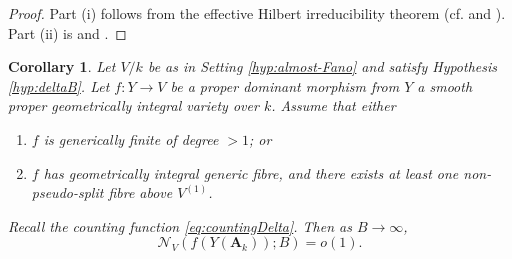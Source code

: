 \documentclass[11pt,letterpaper]{amsart}
\newcommand{\CN}{{\mathcal {N}}}
\newcommand{\RA}{{\mathbf {A}}}
\theoremstyle{plain}
\numberwithin{equation}{section}
\newtheorem{corollary}[theorem]{Corollary}
\theoremstyle{definition}
\theoremstyle{remark}
\begin{document}
\begin{proof}
	Part (i) follows from the effective Hilbert irreducibility theorem (cf. \cite[Theorem 5.1, Lemma 5.2]{Cohen} and \cite[\S3.4]{Serre}). 
	Part (ii) is \cite[Corollary 2.4, Proposition 3.10]{Browning-Loughran} and \cite[Theorem 2.8]{Loughran-Smeets}.
\end{proof}
\begin{corollary}\label{co:paucityfibra}
	Let $V/k$ be as in Setting \ref{hyp:almost-Fano} and satisfy Hypothesis \ref{hyp:deltaB}. Let $f:Y\to V$ be a proper dominant morphism from $Y$ a smooth proper geometrically integral variety over $k$. Assume that either 
	\begin{enumerate}[label=(\roman*)]
			\item  $f$ is generically finite of degree $>1$; or 
				\item $f$ has geometrically integral generic fibre, and there exists at least one non-pseudo-split fibre above $V^{(1)}$. 
	\end{enumerate}
Recall the counting function \eqref{eq:countingDelta}. Then  as $B\to\infty$, $$\CN_{V}(f(Y(\RA_k));B)=o(1).$$
\end{corollary}
\end{document}
